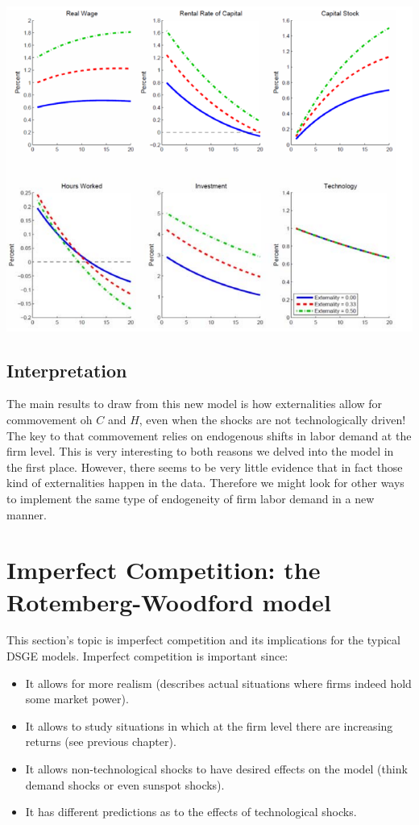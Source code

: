 \documentclass[12pt]{report}
\begin{document}
\begin{center}
\includegraphics[scale=0.4]{images/RBC3-zshock2.PNG} 
\end{center}

\subsection{Interpretation}

The main results to draw from this new model is how externalities allow for commovement oh $C$ and $H$, even when the shocks are not technologically driven! The key to that commovement relies on endogenous shifts in labor demand at the firm level. This is very interesting to both reasons we delved into the model in the first place. However, there seems to be very little evidence that in fact those kind of externalities happen in the data. Therefore we might look for other ways to implement the same type of endogeneity of firm labor demand in a new manner.

\section{Imperfect Competition: the Rotemberg-Woodford model}

This section's topic is imperfect competition and its implications for the typical DSGE models. Imperfect competition is important since:\begin{itemize}
\item It allows for more realism (describes actual situations where firms indeed hold some market power).
\item It allows to study situations in which at the firm level there are increasing returns (see previous chapter).
\item It allows non-technological shocks to have desired effects on the model (think demand shocks or even sunspot shocks).
\item It has different predictions as to the effects of technological shocks.
\end{itemize}
\end{document}
